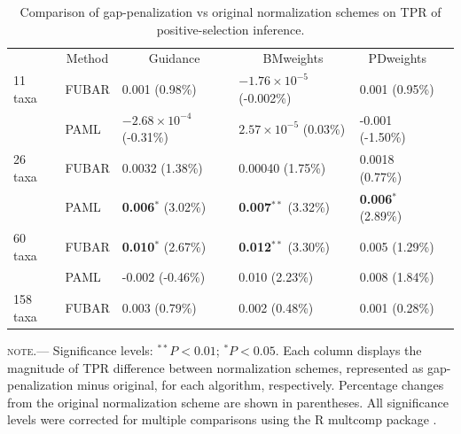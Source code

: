 \documentclass[10pt]{article}
\begin{document}
\begin{table}[H]
\caption {\label{tab:penalmodel} Comparison of gap-penalization vs original normalization schemes on TPR of positive-selection inference.}
\begin{tabular}{l l l l l l}
\hline\noalign{\smallskip}
\multicolumn{1}{c}{Simulation Set} & \multicolumn{1}{c}{Method} & \multicolumn{1}{c}{Guidance} & \multicolumn{1}{c}{BMweights} & \multicolumn{1}{c}{PDweights} \\
\noalign{\smallskip}\hline\noalign{\smallskip}
11 taxa  & FUBAR & 0.001 (0.98\%) & $-1.76\times10^{-5}$ (-0.002\%) & 0.001 (0.95\%)\\
              & PAML & $-2.68\times10^{-4}$ (-0.31\%) & $2.57\times10^{-5}$ (0.03\%) & -0.001 (-1.50\%)\\
\hline
26 taxa   & FUBAR & 0.0032 (1.38\%) & 0.00040 (1.75\%) & 0.0018 (0.77\%)\\
              & PAML & \textbf{0.006}$^{\ast}$ (3.02\%) & \textbf{0.007}$^{\ast\ast}$ (3.32\%) & \textbf{0.006}$^{\ast}$ (2.89\%) \\
\hline
60 taxa  & FUBAR & \textbf{0.010}$^{\ast}$ (2.67\%) & \textbf{0.012}$^{\ast\ast}$ (3.30\%)  & 0.005  (1.29\%)\\
              & PAML & -0.002 (-0.46\%) & 0.010 (2.23\%) & 0.008 (1.84\%) \\
\hline
158 taxa & FUBAR & 0.003 (0.79\%) & 0.002 (0.48\%) & 0.001 (0.28\%)\\
\hline
\end{tabular}
\newline
\textsc{note.}--- Significance levels: $^{\ast\ast} P < 0.01$; $^{\ast} P < 0.05$. Each column displays the magnitude of TPR difference between normalization schemes, represented as gap-penalization minus original, for each algorithm, respectively. Percentage changes from the original normalization scheme are shown in parentheses. All significance levels were corrected for multiple comparisons using the R multcomp package \citep{Hothorn2008}.
\end{table}
\end{document}
